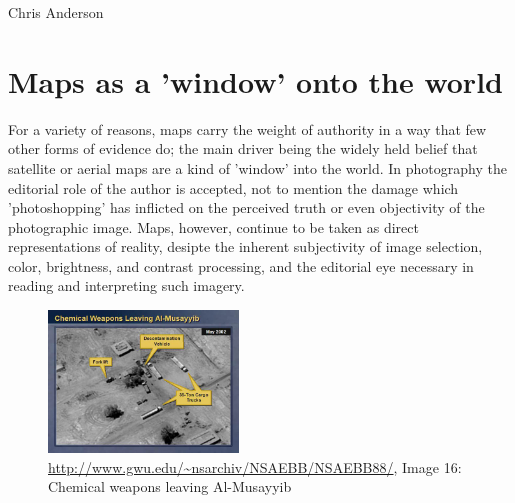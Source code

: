 \documentclass[11pt]{report}
\begin{document}
Chris Anderson 

\section{Maps as a 'window' onto the world}


For a variety of reasons, maps carry the weight of authority in a way that few other forms of evidence do; the main driver being the widely held belief that satellite or aerial maps are a kind of 'window' into the world. In photography the editorial role of the author is accepted, not to mention the damage which 'photoshopping' has inflicted on the perceived truth or even objectivity of the photographic image. Maps, however, continue to be taken as direct representations of reality, desipte the inherent subjectivity of image selection, color, brightness, and contrast processing, and the editorial eye necessary in reading and interpreting such imagery. 

\begin{figure}
	\begin{flushright}
		\includegraphics[width=0.45\textwidth]{images/iraq-image-16.jpg}
		\caption{\url{http://www.gwu.edu/~nsarchiv/NSAEBB/NSAEBB88/}, Image 16: Chemical weapons leaving Al-Musayyib}
	\end{flushright}
\end{figure}
\end{document}
